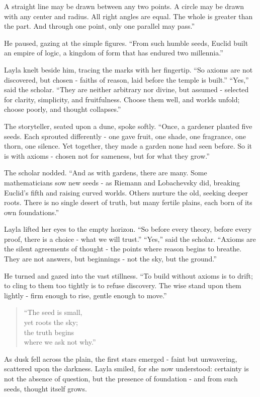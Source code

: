 \documentclass[
  letterpaper,
  DIV=11,
  numbers=noendperiod]{scrreprt}
\begin{document}
A straight line may be drawn between any two points. A circle may be
drawn with any center and radius. All right angles are equal. The whole
is greater than the part. And through one point, only one parallel may
pass.''

He paused, gazing at the simple figures. ``From such humble seeds,
Euclid built an empire of logic, a kingdom of form that has endured two
millennia.''

Layla knelt beside him, tracing the marks with her fingertip. ``So
axioms are not discovered, but chosen - faiths of reason, laid before
the temple is built.'' ``Yes,'' said the scholar. ``They are neither
arbitrary nor divine, but assumed - selected for clarity, simplicity,
and fruitfulness. Choose them well, and worlds unfold; choose poorly,
and thought collapses.''

The storyteller, seated upon a dune, spoke softly. ``Once, a gardener
planted five seeds. Each sprouted differently - one gave fruit, one
shade, one fragrance, one thorn, one silence. Yet together, they made a
garden none had seen before. So it is with axioms - chosen not for
sameness, but for what they grow.''

The scholar nodded. ``And as with gardens, there are many. Some
mathematicians sow new seeds - as Riemann and Lobachevsky did, breaking
Euclid's fifth and raising curved worlds. Others nurture the old,
seeking deeper roots. There is no single desert of truth, but many
fertile plains, each born of its own foundations.''

Layla lifted her eyes to the empty horizon. ``So before every theory,
before every proof, there is a choice - what we will trust.'' ``Yes,''
said the scholar. ``Axioms are the silent agreements of thought - the
points where reason begins to breathe. They are not answers, but
beginnings - not the sky, but the ground.''

He turned and gazed into the vast stillness. ``To build without axioms
is to drift; to cling to them too tightly is to refuse discovery. The
wise stand upon them lightly - firm enough to rise, gentle enough to
move.''

\begin{quote}
``The seed is small,\\
yet roots the sky;\\
the truth begins\\
where we ask not why.''
\end{quote}

As dusk fell across the plain, the first stars emerged - faint but
unwavering, scattered upon the darkness. Layla smiled, for she now
understood: certainty is not the absence of question, but the presence
of foundation - and from such seeds, thought itself grows.
\end{document}
